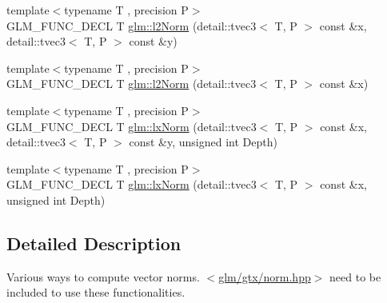\begin{DoxyCompactItemize}
{\footnotesize template$<$typename T , precision P$>$ }\\G\-L\-M\-\_\-\-F\-U\-N\-C\-\_\-\-D\-E\-C\-L T \hyperlink{group__gtx__norm_ga46af6669c4e8b042e284dd3b6c0caf28}{glm\-::l2\-Norm} (detail\-::tvec3$<$ T, P $>$ const \&x, detail\-::tvec3$<$ T, P $>$ const \&y)
\item 
{\footnotesize template$<$typename T , precision P$>$ }\\G\-L\-M\-\_\-\-F\-U\-N\-C\-\_\-\-D\-E\-C\-L T \hyperlink{group__gtx__norm_gacdfd8d645b91db95a191a1294226571b}{glm\-::l2\-Norm} (detail\-::tvec3$<$ T, P $>$ const \&x)
\item 
{\footnotesize template$<$typename T , precision P$>$ }\\G\-L\-M\-\_\-\-F\-U\-N\-C\-\_\-\-D\-E\-C\-L T \hyperlink{group__gtx__norm_gaf2ec2a2b14e0d4ddfadd5b1a98ed9799}{glm\-::lx\-Norm} (detail\-::tvec3$<$ T, P $>$ const \&x, detail\-::tvec3$<$ T, P $>$ const \&y, unsigned int Depth)
\item 
{\footnotesize template$<$typename T , precision P$>$ }\\G\-L\-M\-\_\-\-F\-U\-N\-C\-\_\-\-D\-E\-C\-L T \hyperlink{group__gtx__norm_ga7f76252fa0266db34865dba8a8c0f7d6}{glm\-::lx\-Norm} (detail\-::tvec3$<$ T, P $>$ const \&x, unsigned int Depth)
\end{DoxyCompactItemize}


\subsection{Detailed Description}
Various ways to compute vector norms. $<$\hyperlink{norm_8hpp}{glm/gtx/norm.\-hpp}$>$ need to be included to use these functionalities. 

